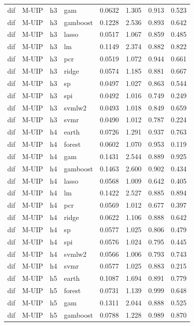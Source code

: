 \begin{ThreePartTable}
\begin{longtable}[t]{llclcccc}
dif & M-UIP & h3 & gam & 0.0632 & 1.305 & 0.913 & 0.523\\
dif & M-UIP & h3 & gamboost & 0.1228 & 2.536 & 0.893 & 0.642\\
dif & M-UIP & h3 & lasso & 0.0517 & 1.067 & 0.859 & 0.485\\
dif & M-UIP & h3 & lm & 0.1149 & 2.374 & 0.882 & 0.822\\
dif & M-UIP & h3 & pcr & 0.0519 & 1.072 & 0.944 & 0.661\\
dif & M-UIP & h3 & ridge & 0.0574 & 1.185 & 0.881 & 0.667\\
dif & M-UIP & h3 & sp & 0.0497 & 1.027 & 0.863 & 0.544\\
dif & M-UIP & h3 & spi & 0.0492 & 1.016 & 0.749 & 0.249\\
dif & M-UIP & h3 & svmlw2 & 0.0493 & 1.018 & 0.849 & 0.659\\
dif & M-UIP & h3 & svmr & 0.0490 & 1.012 & 0.787 & 0.224\\
\addlinespace
dif & M-UIP & h4 & earth & 0.0726 & 1.291 & 0.937 & 0.763\\
dif & M-UIP & h4 & forest & 0.0602 & 1.070 & 0.953 & 0.119\\
dif & M-UIP & h4 & gam & 0.1431 & 2.544 & 0.889 & 0.925\\
dif & M-UIP & h4 & gamboost & 0.1463 & 2.600 & 0.902 & 0.434\\
dif & M-UIP & h4 & lasso & 0.0568 & 1.009 & 0.642 & 0.405\\
dif & M-UIP & h4 & lm & 0.1422 & 2.527 & 0.885 & 0.894\\
dif & M-UIP & h4 & pcr & 0.0569 & 1.012 & 0.677 & 0.397\\
dif & M-UIP & h4 & ridge & 0.0622 & 1.106 & 0.888 & 0.642\\
dif & M-UIP & h4 & sp & 0.0577 & 1.025 & 0.806 & 0.479\\
dif & M-UIP & h4 & spi & 0.0576 & 1.024 & 0.795 & 0.445\\
dif & M-UIP & h4 & svmlw2 & 0.0566 & 1.006 & 0.793 & 0.743\\
dif & M-UIP & h4 & svmr & 0.0577 & 1.025 & 0.883 & 0.215\\
\addlinespace
dif & M-UIP & h5 & earth & 0.1087 & 1.694 & 0.891 & 0.779\\
dif & M-UIP & h5 & forest & 0.0731 & 1.139 & 0.999 & 0.648\\
dif & M-UIP & h5 & gam & 0.1311 & 2.044 & 0.888 & 0.525\\
dif & M-UIP & h5 & gamboost & 0.0788 & 1.228 & 0.989 & 0.870\\

\end{longtable}
\end{ThreePartTable}
